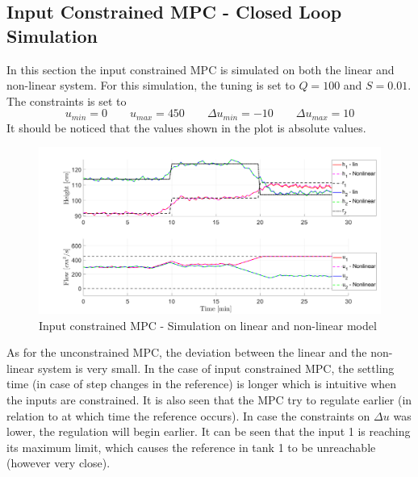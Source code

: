 \subsection{Input Constrained MPC - Closed Loop Simulation}
In this section the input constrained MPC is simulated on both the linear and non-linear system. For this simulation, the tuning is set to $Q=100$ and $S=0.01$. The constraints is set to 
\begin{equation}
    u_{min}=0\qquad u_{max}=450\qquad \Delta u_{min}=-10\qquad \Delta u_{max}=10
\end{equation}
It should be noticed that the values shown in the plot is absolute values.
\begin{figure}[H]
    \centering
    \includegraphics[width=1\textwidth]{Figures/Pr10.2_Input_con_MPC.png}
    \caption{Input constrained MPC - Simulation on linear and non-linear model}
\end{figure}
As for the unconstrained MPC, the deviation between the linear and the non-linear system is very small. In the case of input constrained MPC, the settling time (in case of step changes in the reference) is longer which is intuitive when the inputs are constrained. It is also seen that the MPC try to regulate earlier (in relation to at which time the reference occurs). In case the constraints on $\Delta u$ was lower, the regulation will begin earlier.
It can be seen that the input 1 is reaching its maximum limit, which causes the reference in tank 1 to be unreachable (however very close). 
